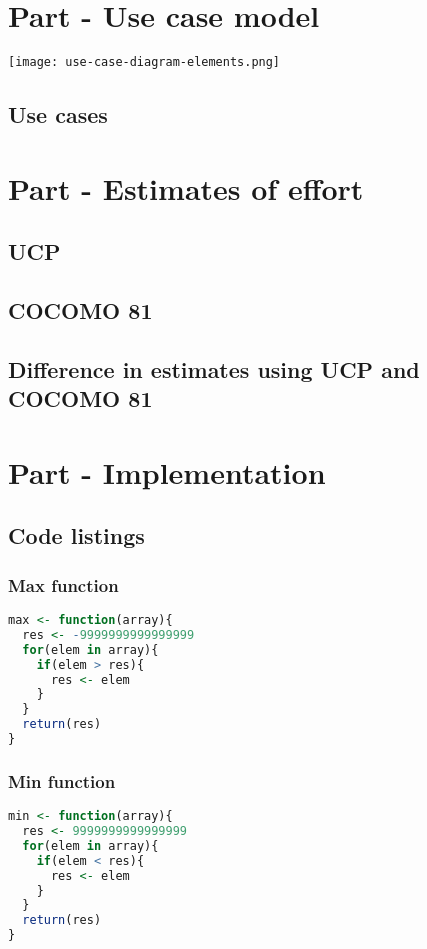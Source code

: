 \documentclass[12pt]{article}
\begin{document}
\section{Part - Use case model}
\texttt{[image: use-case-diagram-elements.png]}

\subsection{Use cases}

\section{Part - Estimates of effort}
\subsection{UCP}
\subsection{COCOMO 81}
\subsection{Difference in estimates using UCP and COCOMO 81}
\section{Part - Implementation}
\subsection{Code listings}
\subsubsection{Max function}

\begin{lstlisting}[language=R]
max <- function(array){
  res <- -9999999999999999
  for(elem in array){
    if(elem > res){
      res <- elem
    }
  }
  return(res)
}
\end{lstlisting}
\subsubsection{Min function}

\begin{lstlisting}[language=R]
min <- function(array){
  res <- 9999999999999999
  for(elem in array){
    if(elem < res){
      res <- elem
    }
  }
  return(res)
}
\end{lstlisting}
\end{document}
